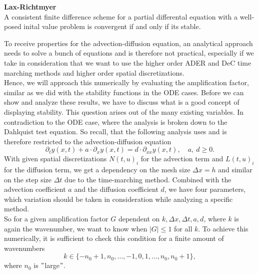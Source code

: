 \begin{theorem}\textbf{Lax-Richtmyer}\\
	A consistent finite difference scheme for a partial differental equation with a well-posed inital value problem is convergent if and only if its stable.
\end{theorem}
To receive properties for the advection-diffusion equation, an analytical approach needs to solve a bunch of equations and is therefore not practical, especially if we take in consideration that we want to use the higher order ADER and DeC time marching methods and higher order spatial discretizations. \\
Hence, we will approach this numerically by evaluating the amplification factor, similar as we did with the stability functions in the ODE cases.
Before we can show and analyze these results, we have to discuss what is a good concept of displaying stability. This question arises out of the many existing variables. In contradiction to the ODE case, where the analysis is broken down to the Dahlquist test equation.
So recall, that the following analysis uses and is therefore restricted to the advection-diffusion equation
\begin{equation}
\partial_t y(x,t)+a\cdot \partial_x y(x,t)=d\cdot \partial_{xx }y(x,t), \quad a , \ d \ge 0.
\end{equation}
With given spatial discretizations $N(t,u)_i$ for the advection term and $L(t,u)_i$ for the diffusion term, we get a dependency on the mesh size $\Delta x=h$ and similar on the step size $\Delta t$ due to the time-marching method.
Combined with the advection coefficient $a$ and the diffusion coefficient $d$, we have four parameters, which variation should be taken in consideration while analyzing a specific method.\\
So for a given amplification factor $G$ dependent on $k, \Delta x, \Delta t, a, d$, where $k$ is again the wavenumber, we want to know when $\lvert G \rvert\le 1$ for all $k$. To achieve this numerically, it is sufficient to check this condition for a finite amount of wavenumbers
\begin{equation*}
k\in\{-n_0+1,n_0,\hdots,-1,0,1,\hdots,n_0,n_0+1\},
\end{equation*}
where $n_0$ is $"$large$"$.\\
